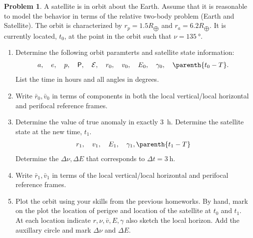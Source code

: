 \documentclass[10pt]{article}
\theoremstyle{definition}
\newtheorem{prob}{Problem}[section]
\newenvironment{subprob}%
{\renewcommand{\theenumi}{\alph{enumi}}\renewcommand{\labelenumi}{(\theenumi)}\begin{enumerate}}%
{\end{enumerate}}%
\begin{document}
\begin{prob}
    A satellite is in orbit about the Earth. 
    Assume that it is reasonable to model the behavior in terms of the relative two-body problem (Earth and Satellite).
    The orbit is characterized by \( r_p = 1.5 R_{\bigoplus} \) and \( r_a = 6.2 R_{\bigoplus} \).
    It is currently located, \( t_0 \), at the point in the orbit such that \( \nu = \SI{135}{\degree} \).

    \begin{subprob}
        \item Determine the following orbit paramterts and satellite state information:
            \begin{align*}
                a, \quad e, \quad p, \quad \mathsf{P}, \quad \mathcal{E}, \quad r_0, \quad v_0, \quad E_0, \quad \gamma_0, \quad \parenth{t_0 - T}.
            \end{align*}
            List the time in hours and all angles in degrees.
        \item Write \( \bar r_0, \bar v_0 \) in terms of components in both the local vertical/local horizontal and perifocal reference frames.
        \item Determine the value of true anomaly in exactly \SI{3}{\hour}.
            Determine the satellite state at the new time, \( t_1 \).
            \begin{align*}
                r_1, \quad v_1, \quad E_1, \quad \gamma_1, \parenth{t_1 - T}
            \end{align*}
            Determine the \( \Delta \nu, \Delta E \) that corresponds to \( \Delta t = \SI{3}{\hour} \).
        \item Write \( \bar r_1, \bar v_1 \) in terms of the local vertical/local horizontal and perifocal reference frames.
        \item Plot the orbit using your skills from the previous homeworks.
            By hand, mark on the plot the location of perigee and location of the satellite at \( t_0 \) and \( t_1 \). 
            At each location indicate \( r, \nu, \bar v, E, \gamma \) also sketch the local horizon.
            Add the auxillary circle and mark \( \Delta \nu \) and \( \Delta E \).
    \end{subprob}
\end{prob}
\end{document}
